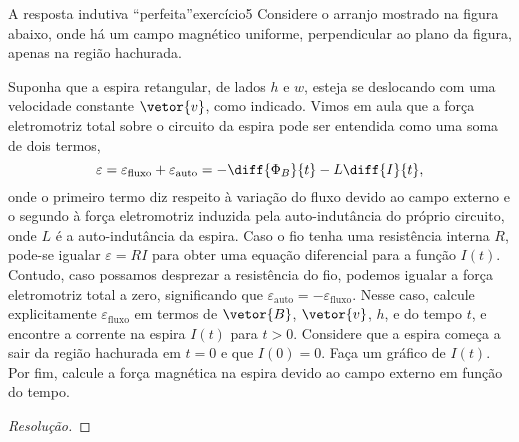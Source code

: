 \begin{exercício}{A resposta indutiva \enquote{perfeita}}{exercício5}
    Considere o arranjo mostrado na figura abaixo, onde há um campo magnético uniforme, perpendicular ao plano da figura, apenas na região hachurada.
    \begin{center}
    \end{center}
    Suponha que a espira retangular, de lados \(h\) e \(w\), esteja se deslocando com uma velocidade constante \(\vetor{v}\), como indicado. Vimos em aula que a força eletromotriz total sobre o circuito da espira pode ser entendida como uma soma de dois termos,
    \begin{equation*}
        \varepsilon = \varepsilon_{\mathrm{fluxo}} + \varepsilon_{\mathrm{auto}} = - \diff{\Phi_{B}}{t} - L\diff{I}{t},
    \end{equation*}
    onde o primeiro termo diz respeito à variação do fluxo devido ao campo externo e o segundo à força eletromotriz induzida pela auto-indutância do próprio circuito, onde \(L\) é a auto-indutância da espira. Caso o fio tenha uma resistência interna \(R\), pode-se igualar \(\varepsilon = RI\) para obter uma equação diferencial para a função \(I(t)\). Contudo, caso possamos desprezar a resistência do fio, podemos igualar a força eletromotriz total a zero, significando que \(\varepsilon_{\mathrm{auto}} = -\varepsilon_{\mathrm{fluxo}}\). Nesse caso, calcule explicitamente \(\varepsilon_{\mathrm{fluxo}}\) em termos de \(\vetor{B}\), \(\vetor{v}\), \(h\), e do tempo \(t\), e encontre a corrente na espira \(I(t)\) para \(t > 0\). Considere que a espira começa a sair da região hachurada em \(t = 0\) e que \(I(0) = 0\). Faça um gráfico de \(I(t)\). Por fim, calcule a força magnética na espira devido ao campo externo em função do tempo.
\end{exercício}
\begin{proof}[Resolução]

\end{proof}
